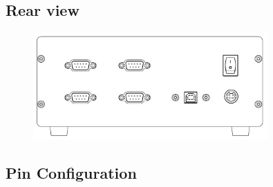 \documentclass[a4paper, final, 12pt, oneside]{scrartcl}
\numberwithin{equation}{section}
\numberwithin{table}{section}
\numberwithin{figure}{section}
\begin{document}
\subsection*{Rear view}
\begin{figure}[!htp]
  \centering
  \includegraphics[angle=0,origin=c,width=0.8\textwidth]{./drawings/MG22131_back.pdf}
\end{figure}
\FloatBarrier

\subsection*{Pin Configuration}
\end{document}
